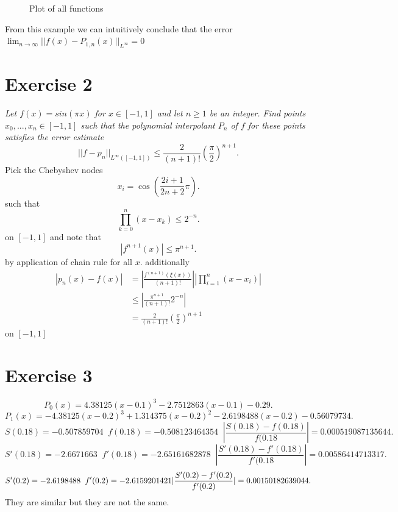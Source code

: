\documentclass{amsart}
\begin{document}
\begin{enumerate}[label = (\alph*)]
\begin{figure}[h]
                \caption{Plot of all functions}
                \label{fig:multiple_function}
            \end{figure}
            From this example we can intuitively conclude that the error $\lim_{n\to \infty}||f(x) - P_{1,n}(x)||_{L^{\infty}} = 0$
            \clearpage
        
    \end{enumerate}
    \section{Exercise 2}
    \emph{
        Let $f(x) = sin(\pi x)$ for $x \in [-1,1]$ and let $n \ge 1$ be an integer. Find points $x_0,...,x_n \in [-1,1]$ such
        that the polynomial interpolant $P_n$ of $f$ for these points satisfies the error estimate
        \[
            ||f - p_n||_{L^{\infty}([-1,1])} \le \frac{2}{(n+1)!}(\frac{\pi}{2})^{n+1}
        .\] 
    }
    Pick the Chebyshev nodes
    \[
    x_i = \cos(\frac{2 i+1}{2n+2}\pi)
    .\] 
    such that
    \[
        \prod_{k=0}^{n}(x-x_k) \le 2^{-n}
    .\] 
    on $[-1,1]$
    and note that
    \[
        |f^{n+1}(x)| \le \pi^{{n+1}}
    .\] 
    by application of chain rule for all $x$. additionally
    \begin{align*}
        |p_n(x)-f(x)| &= |\frac{f^{(n+1)}( \xi(x))}{(n+1)!}||\prod_{i=1}^{n}(x-x_i)|\\
                      &\le |\frac{\pi^{n+1}}{(n+1)!}2^{-n}|\\
                      &= \frac{2}{(n+1)!}(\frac{\pi}{2})^{n+1}
    \end{align*}
    on $[-1,1]$
    \section{Exercise 3}
    \[
    P_0(x)= 4.38125\left(x-0.1\right)^{3}-2.7512863\left(x-0.1\right)-0.29
    .\] 
    \[
    P_1(x) = -4.38125\left(x-0.2\right)^{3}+1.314375\left(x-0.2\right)^{2}-2.6198488\left(x-0.2\right)-0.56079734
    .\] 
    \[
    S(0.18) = -0.507859704 \;\; f(0.18) = -0.508123464354 \;\; |\frac{S(0.18) - f(0.18)}{f(0.18}| = 0.000519087135644
    .\] 
    \[
    S'(0.18) = -2.6671663 \;\; f'(0.18) = -2.65161682878 \;\; |\frac{S'(0.18)-f'(0.18)}{f'(0.18}| = 0.00586414713317
    .\] 
    \[
    S'(0.2) = -2.6198488 \;\; f'(0.2) = -2.6159201421 \\ |\frac{S'(0.2)-f'(0.2)}{f'(0.2)}| = 0.00150182639044
    .\] 
    They are similar but they are not the same.
\end{document}
